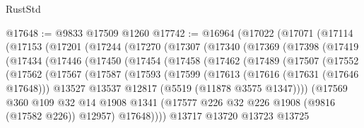 \begin{lexlean}{RustStd}
\begin{coremodule}
@17648 := @9833 @17509 @1260
@17742 := @16964
    (@17022
      (@17071
        (@17114
          (@17153
            (@17201
              (@17244
                (@17270
                  (@17307
                    (@17340
                      (@17369
                        (@17398
                          (@17419
                            (@17434
                              (@17446
                                (@17450
                                  (@17454
                                    (@17458
                                      (@17462
                                        (@17489
                                          (@17507
                                            (@17552
                                              (@17562
                                                (@17567
                                                  (@17587
                                                    (@17593
                                                      (@17599
                                                        (@17613
                                                          (@17616 (@17631 (@17646 @17648)))
                                                          @13527
                                                          @13537
                                                          @12817
                                                          (@5519 (@11878 @3575 @1347))))
                                                      (@17569
                                                        @360
                                                        @109
                                                        @32
                                                        @14
                                                        @1908
                                                        @1341
                                                        (@17577
                                                          @226
                                                          @32
                                                          @226
                                                          @1908
                                                          (@9816 (@17582 @226))
                                                          @12957)
                                                        @17648))))
                                                @13717
                                                @13720
                                                @13723
                                                @13725

\end{coremodule}
\end{lexlean}
